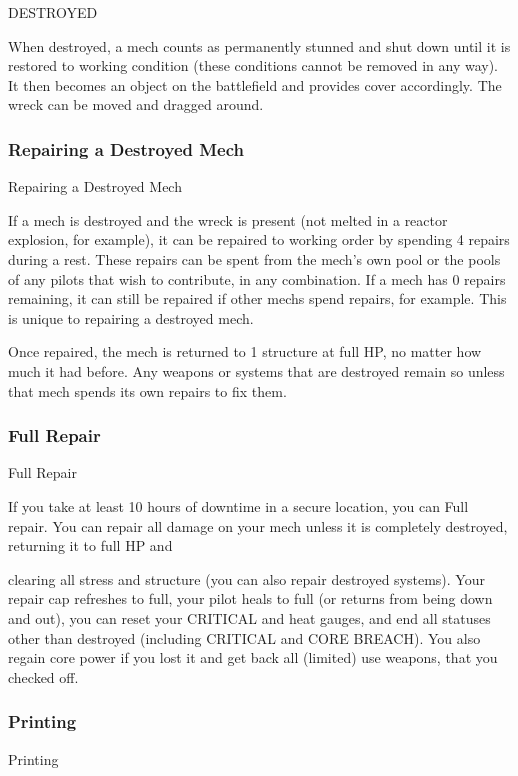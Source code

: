                                                  DESTROYED

When destroyed, a mech counts as permanently stunned and shut down until it is restored to
working condition (these conditions cannot be removed in any way). It then becomes an object
on the battlefield and provides cover accordingly. The wreck can be moved and dragged around.

\subsubsection{Repairing a Destroyed Mech}
                                  Repairing a Destroyed Mech

If a mech is destroyed and the wreck is present (not melted in a reactor explosion, for example), it
can be repaired to working order by spending 4 repairs during a rest. These repairs can be spent
from the mech’s own pool or the pools of any pilots that wish to contribute, in any combination. If a
mech has 0 repairs remaining, it can still be repaired if other mechs spend repairs, for example.
This is unique to repairing a destroyed mech.

Once repaired, the mech is returned to 1 structure at full HP, no matter how much it had before.
Any weapons or systems that are destroyed remain so unless that mech spends its own repairs to
fix them.
\subsubsection{Full Repair}
                                                Full Repair

If you take at least 10 hours of downtime in a secure location, you can Full repair. You can
repair all damage on your mech unless it is completely destroyed, returning it to full HP and




clearing all stress and structure (you can also repair destroyed systems). Your repair cap
refreshes to full, your pilot heals to full (or returns from being down and out), you can reset
your CRITICAL and heat gauges, and end all statuses other than destroyed (including
CRITICAL and CORE BREACH). You also regain core power if you lost it and get back all
(limited) use weapons, that you checked off.

\subsubsection{Printing}
                                                   Printing

